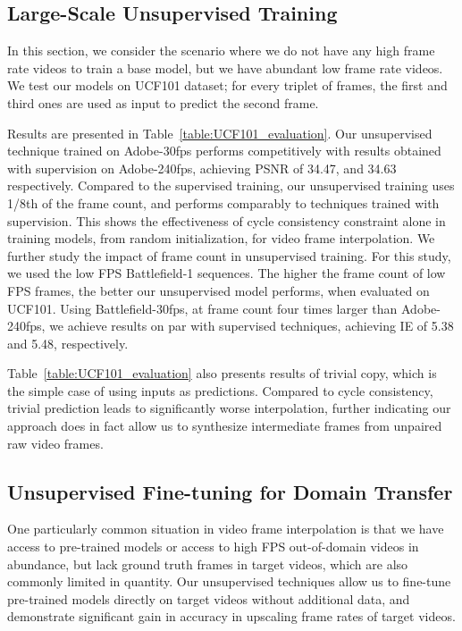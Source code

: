 \documentclass[10pt,twocolumn,letterpaper]{article}
\begin{document}
\subsection{Large-Scale Unsupervised Training}\label{Unsupervised_large_scale_training}
In this section, we consider the scenario where we do not have any high frame rate videos to train a base model, but we have abundant low frame rate videos.
We test our models on UCF101 dataset; for every triplet of frames, the first and third ones are used as input to predict the second frame.

Results are presented in Table~\ref{table:UCF101_evaluation}.
Our unsupervised technique trained on Adobe-30fps performs competitively with results obtained with supervision on Adobe-240fps, achieving PSNR of 34.47, and 34.63 respectively.
Compared to the supervised training, our unsupervised training uses 1/8th of the frame count, and performs comparably to techniques trained with supervision. This shows the effectiveness of cycle consistency constraint alone in training models, from random initialization, for video frame interpolation.
We further study the impact of frame count in unsupervised training. For this study, we used the low FPS Battlefield-1 sequences. The higher the frame count of low FPS frames, the better our unsupervised model performs, when evaluated on UCF101. Using Battlefield-30fps, at frame count four times larger than Adobe-240fps, we achieve results on par with supervised techniques, achieving IE of 5.38 and 5.48, respectively.

Table~\ref{table:UCF101_evaluation} also presents results of trivial copy, which is the simple case of using inputs as predictions. Compared to cycle consistency, trivial prediction leads to significantly worse interpolation, further indicating our approach does in fact allow us to synthesize intermediate frames from unpaired raw video frames.

\subsection{Unsupervised Fine-tuning for Domain Transfer}\label{domain_transfer}

One particularly common situation in video frame interpolation is that we have access to pre-trained models or access to high FPS out-of-domain videos in abundance, but lack ground truth frames in target videos, which are also commonly limited in quantity. Our unsupervised techniques allow us to fine-tune pre-trained models directly on target videos without additional data, and demonstrate significant gain in accuracy in upscaling frame rates of target videos.
\end{document}
